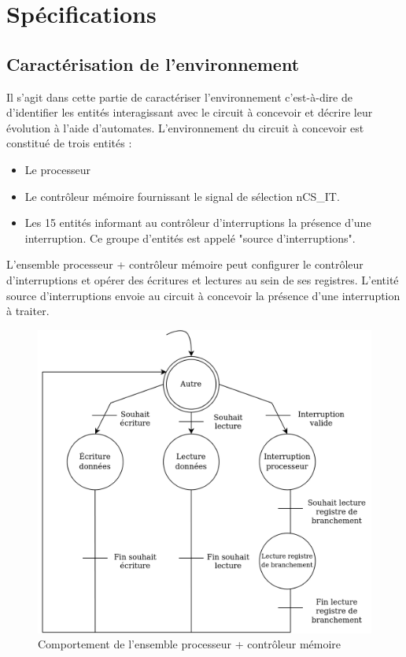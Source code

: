 \section{Spécifications}

\subsection{Caractérisation de l'environnement}

Il s'agit dans cette partie de caractériser l'environnement c'est-à-dire de d'identifier les entités interagissant avec le circuit à concevoir et décrire leur évolution à l'aide d'automates.
L'environnement du circuit à concevoir est constitué de trois entités :

\begin{itemize}
	\item Le processeur
	\item Le contrôleur mémoire fournissant le signal de sélection nCS\_IT.
	\item Les 15 entités informant au contrôleur d'interruptions la présence d'une interruption.
	Ce groupe d'entités est appelé "source d'interruptions".
\end{itemize}

L'ensemble processeur + contrôleur mémoire peut configurer le contrôleur d'interruptions et opérer des écritures et lectures au sein de ses registres.
L'entité source d'interruptions envoie au circuit à concevoir la présence d'une interruption à traiter.

\begin{figure}[H]
	\centering
	\includegraphics[width=0.8\linewidth]{figure/spec_automate_proc_ctrlmem.png}
	\caption{Comportement de l'ensemble processeur + contrôleur mémoire}
	\label{fig:spec_automate_proc_ctrlmem}
\end{figure} 

